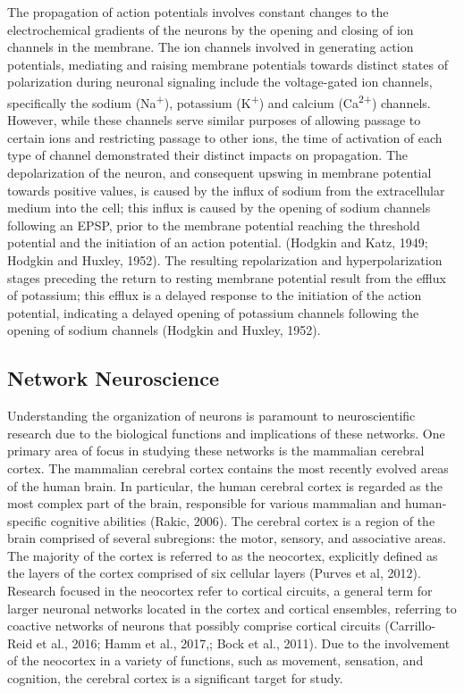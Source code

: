 \documentclass[11pt]{article}
\begin{document}
The propagation of action potentials involves constant changes to the electrochemical gradients of the neurons by the opening and closing of ion channels in the membrane. The ion channels involved in generating action potentials, mediating and raising membrane potentials towards distinct states of polarization during neuronal signaling include the voltage-gated ion channels, specifically the sodium (Na\textsuperscript{+}), potassium (K\textsuperscript{+}) and calcium (Ca\textsuperscript{2+}) channels. However, while these channels serve similar purposes of allowing passage to certain ions and restricting passage to other ions, the time of activation of each type of channel demonstrated their distinct impacts on propagation. The depolarization of the neuron, and consequent upswing in membrane potential towards positive values, is caused by the influx of sodium from the extracellular medium into the cell; this influx is caused by the opening of sodium channels following an EPSP, prior to the membrane potential reaching the threshold potential and the initiation of an action potential. (Hodgkin and Katz, 1949; Hodgkin and Huxley, 1952). The resulting repolarization and hyperpolarization stages preceding the return to resting membrane potential result from the efflux of potassium; this efflux is a delayed response to the initiation of the action potential, indicating a delayed opening of potassium channels following the opening of sodium channels (Hodgkin and Huxley, 1952).\par

\subsection{Network Neuroscience}
Understanding the organization of neurons is paramount to neuroscientific research due to the biological functions and implications of these networks. One primary area of focus in studying these networks is the mammalian cerebral cortex. The mammalian cerebral cortex contains the most recently evolved areas of the human brain. In particular, the human cerebral cortex is regarded as the most complex part of the brain, responsible for various mammalian and human-specific cognitive abilities (Rakic, 2006). The cerebral cortex is a region of the brain comprised of several subregions: the motor, sensory, and associative areas. The majority of the cortex is referred to as the neocortex, explicitly defined as the layers of the cortex comprised of six cellular layers (Purves et al, 2012). %
Research focused in the neocortex refer to cortical circuits, a general term for larger neuronal networks located in the cortex and cortical ensembles, referring to coactive networks of neurons that possibly comprise cortical circuits (Carrillo-Reid et al., 2016; Hamm et al., 2017,; Bock et al., 2011). Due to the involvement of the neocortex in a variety of functions, such as movement, sensation, and cognition, the cerebral cortex is a significant target for study.\par
\end{document}
